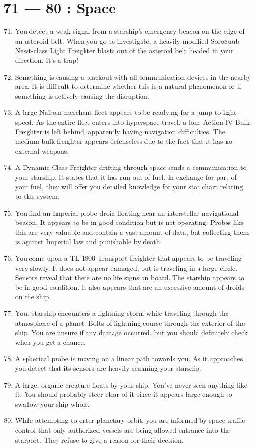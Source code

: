 \documentclass{article}
\begin{document}
\section*{71 --- 80 : Space}
\begin{enumerate}
	\setcounter{enumi}{70}
	\item You detect a weak signal from a starship’s emergency beacon on the edge of an asteroid belt. When you go to investigate, a heavily modified SoroSuub Nesst-class Light Freighter blasts out of the asteroid belt headed in your direction. It’s a trap!
	\item Something is causing a blackout with all communication devices in the nearby area. It is difficult to determine whether this is a natural phenomenon or if something is actively causing the disruption.
	\item A large Nalroni merchant fleet appears to be readying for a jump to light speed. As the entire fleet enters into hyperspace travel, a lone Action IV Bulk Freighter is left behind, apparently having navigation difficulties. The medium bulk freighter appears defenseless due to the fact that it has no external weapons.
	\item A Dynamic-Class Freighter drifting through space sends a communication to your starship. It states that it has run out of fuel. In exchange for part of your fuel, they will offer you detailed knowledge for your star chart relating to this system.
	\item You find an Imperial probe droid floating near an interstellar navigational beacon. It appears to be in good condition but is not operating. Probes like this are very valuable and contain a vast amount of data, but collecting them is against Imperial law and punishable by death.
	\item You come upon a TL-1800 Transport freighter that appears to be traveling very slowly. It does not appear damaged, but is traveling in a large circle. Sensors reveal that there are no life signs on board. The starship appears to be in good condition. It also appears that are an excessive amount of droids on the ship.
	\item Your starship encounters a lightning storm while traveling through the atmosphere of a planet. Bolts of lightning course through the exterior of the ship. You are unsure if any damage occurred, but you should definitely check when you get a chance.
	\item A spherical probe is moving on a linear path towards you. As it approaches, you detect that its sensors are heavily scanning your starship.
	\item A large, organic creature floats by your ship. You’ve never seen anything like it. You should probably steer clear of it since it appears large enough to swallow your ship whole.
	\item While attempting to enter planetary orbit, you are informed by space traffic control that only authorized vessels are being allowed entrance into the starport. They refuse to give a reason for their decision.
\end{enumerate}
\end{document}
